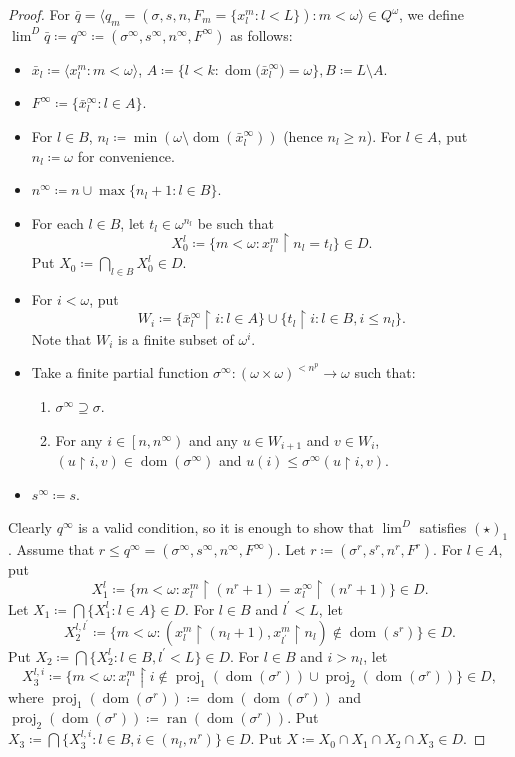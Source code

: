 \documentclass[a4paper,12pt]{amsart}
\theoremstyle{definition}
\numberwithin{thm}{section}
\numberwithin{equation}{section}
\newcommand{\on}{\mathpunct{\upharpoonright}}
\DeclareMathOperator{\dom}{dom}
\DeclareMathOperator{\ran}{ran}
\begin{document}
\begin{proof}
    	For $\bar{q}=\langle q_m=(\sigma,s,n,F_m=\{x^m_l:l<L\}):m<\omega\rangle\in Q^\omega$,
    	we define $\lim^D\bar{q}\coloneqq q^\infty\coloneqq(\sigma^\infty,s^\infty,n^\infty,F^\infty)$ as follows: 
    	\begin{itemize}
    		\item $\bar{x}_l\coloneq\langle x^m_l:m<\omega\rangle$, $A\coloneq\{l<k:{\dom(\bar{x}_l^\infty})=\omega\}, B\coloneq L\setminus A$.
    		\item $F^\infty\coloneq\{{\bar{x}_l^\infty}:l\in A\}$.
    		\item For $l\in B$, $n_l\coloneqq \min(\omega\setminus \dom(\bar{x}_l^\infty))$
    		(hence $n_l\geq n$). For $l\in A$, put $n_l\coloneqq\omega$ for convenience.
    		\item $n^\infty\coloneqq n \cup \max\{n_l+1:l\in B\}$. 
    		\item For each $l\in B$, let $t_l\in\omega^{n_l}$ be such that \[
            X_0^l\coloneqq\{m<\omega:x_l^m\on n_l=t_l\}\in D.
            \]
            Put $X_0\coloneqq\bigcap_{l\in B}X_0^l\in D$.
    		\item For $i<\omega$,
            put
            \[
            W_i\coloneqq\{\bar{x}_l^\infty\on i:l\in A\}\cup\{t_l\on i:l\in B, i\leq n_l\}.
            \]
            Note that $W_i$ is a finite subset of $\omega^i$.
    		\item Take a finite partial function $\sigma^\infty\colon(\omega\times\omega)^{<n^p}\to\omega$ such that:
    		\begin{enumerate}
    			\item $\sigma^\infty\supseteq\sigma$.
    			\item For any $i\in\left[n,n^\infty\right)$ and any $u\in W_{i+1}$ and $v\in W_i$, $(u\on i,v)\in\dom(\sigma^\infty)$ and $u(i)\leq\sigma^\infty(u\on i,v)$.
    		\end{enumerate}
    		\item $s^\infty\coloneqq s$.
    	\end{itemize}
    	Clearly $q^\infty$ is a valid condition,
    	so it is enough to show that $\lim^D$ satisfies $(\star)_1$.
    	Assume that  $r\leq q^\infty=(\sigma^\infty,s^\infty,n^\infty,F^\infty)$.
    	Let $r\coloneq (\sigma^r,s^r,n^r,F^r)$.
    	For $l\in A$, put
        \[
        X_1^l\coloneqq\{m<\omega:x^m_l\on (n^r+1)=x^\infty_l\on(n^r+1)\}\in D.
        \]
    	Let $X_1\coloneqq \bigcap\{X_1^l:l\in A\}\in D$.
    	For $l\in B$ and $l^\prime<L$, let
        \[
        X_2^{l,l^\prime}\coloneqq \{m<\omega:(x^m_l\on(n_l+1),x^m_{l^\prime}\on n_l)\notin\dom(s^r)\}\in D.
        \]
    	Put $X_2\coloneqq\bigcap\{X_2^l:l\in B,l^\prime<L\}\in D$.
    	For $l\in B$ and $i>n_l$, let
        \[
        X_3^{l,i}\coloneqq \{m<\omega:x^m_l\on i\notin\operatorname{proj}_1(\dom(\sigma^r))\cup\operatorname{proj}_2(\dom(\sigma^r))\}\in D,
        \]
        where $\operatorname{proj}_1(\dom(\sigma^r))\coloneqq\dom(\dom(\sigma^r))$ and $\operatorname{proj}_2(\dom(\sigma^r))\coloneqq\ran(\dom(\sigma^r))$.
    	Put $X_3\coloneqq\bigcap\{X_3^{l,i}:l\in B, i\in\left(n_l,n^r\right)\}\in D$. Put $X\coloneq X_0\cap X_1\cap X_2\cap X_3\in D$.
        

\end{proof}
\end{document}
